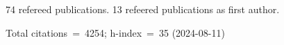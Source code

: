 74 refereed publications. 13 refeered publications as first author.

Total citations~=~4254; h-index~=~35 (2024-08-11)